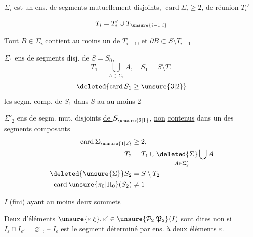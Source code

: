 $\Sigma_i$ est un ens. de segments  mutuellement disjoints, $\operatorname{card}\Sigma_i\geq 2$,  de réunion $T_i'$ 

\reversemarginpar{} \[T_i=T_i'\cup T_{\unsure{i-1|i}}\] \noindent\llap{\rule[-2\baselineskip]{.4pt}{3\baselineskip}\hspace{.4em}}

Tout $B\in\Sigma_i$ contient au moins un   de $T_{i-1}$, et $\partial B\subset S\setminus T_{i-1}$ \normalmarginpar

\noindent\begin{minipage}[t]{.46\linewidth}
$\Sigma_1$ ens de segments  disj. de $S=S_0$,   \[T_1=\bigcup_{A\in\Sigma_1} A,\quad S_1=S\setminus T_1\] \[\deleted{\operatorname{card}S_1\geq\unsure{3|2}}\] les segm. comp. de $S_1$ dans $S$ au  au moins $2$
\end{minipage}\hfill\begin{minipage}[t]{.51\linewidth}
$\Sigma'_2$ ens de segm. mut. disjoints \uline{de $S_{\unsure{2|1}}$}, \uline{non} \uline{contenus} dans un des segments composants \[\begin{aligned}\operatorname{card}\Sigma_{\unsure{1|2}}&\geq 2,\\ T_2&=T_1\cup\mathop{\deleted{\Sigma}\bigcup}\limits_{A\in\Sigma'_2} A\\ \deleted{\unsure{\Sigma}}S_2&=S\setminus T_2\\ \operatorname{card}\unsure{\pi_0|\Pi_0}(S_2)&\ne 1\end{aligned}\]
\end{minipage}

$I$  (fini) ayant au moins deux sommets

Deux  d'éléments $\unsure{\varepsilon|\xi},\varepsilon'\in\unsure{\mathcal{P}_2|\mathfrak{P}_2}(I)$ sont dites \uline{non } si  $I_{\varepsilon}\cap I_{\varepsilon'}=\varnothing$ , -- $I_{\varepsilon}$ est le segment déterminé par  ens. à deux éléments $\varepsilon$.

